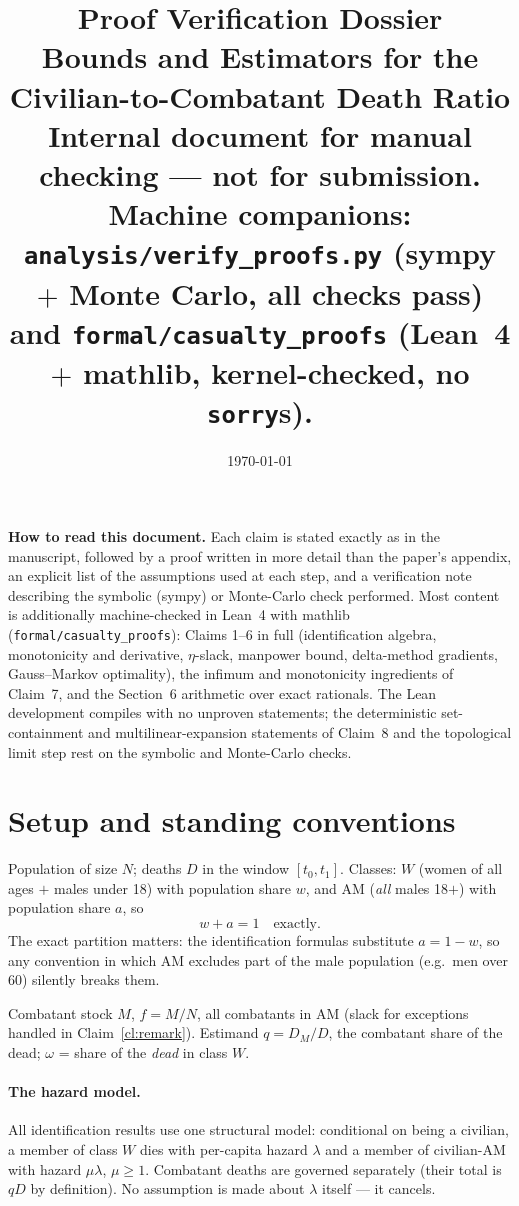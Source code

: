 \documentclass[11pt,a4paper]{article}
\title{\textbf{Proof Verification Dossier}\\[4pt]
\large Bounds and Estimators for the Civilian-to-Combatant Death Ratio\\[2pt]
\normalsize Internal document for manual checking --- not for submission.\\
Machine companions: \texttt{analysis/verify\_proofs.py} (sympy $+$ Monte Carlo, all checks pass)\\
and \texttt{formal/casualty\_proofs} (Lean~4 $+$ mathlib, kernel-checked, no \texttt{sorry}s).}
\author{}
\date{\today}
\theoremstyle{plain}
\theoremstyle{remark}
\begin{document}
\maketitle

\noindent\textbf{How to read this document.} Each claim is stated exactly as in the manuscript, followed by a proof written in more detail than the paper's appendix, an explicit list of the assumptions used at each step, and a verification note describing the symbolic (sympy) or Monte-Carlo check performed. Most content is additionally machine-checked in Lean~4 with mathlib (\texttt{formal/casualty\_proofs}): Claims 1--6 in full (identification algebra, monotonicity and derivative, $\eta$-slack, manpower bound, delta-method gradients, Gauss--Markov optimality), the infimum and monotonicity ingredients of Claim~7, and the Section~6 arithmetic over exact rationals. The Lean development compiles with no unproven statements; the deterministic set-containment and multilinear-expansion statements of Claim~8 and the topological limit step rest on the symbolic and Monte-Carlo checks.

\tableofcontents

\section{Setup and standing conventions}

Population of size $N$; deaths $D$ in the window $[t_0,t_1]$. Classes: $W$ (women of all ages $+$ males under 18) with population share $w$, and $\mathrm{AM}$ (\emph{all} males 18$+$) with population share $a$, so
\[
w + a = 1 \quad\text{exactly.}
\]
The exact partition matters: the identification formulas substitute $a=1-w$, so any convention in which $\mathrm{AM}$ excludes part of the male population (e.g.\ men over 60) silently breaks them.

Combatant stock $M$, $f = M/N$, all combatants in $\mathrm{AM}$ (slack for exceptions handled in Claim~\ref{cl:remark}). Estimand $q = D_M/D$, the combatant share of the dead; $\omega$ = share of the \emph{dead} in class $W$.

\paragraph{The hazard model.} All identification results use one structural model: conditional on being a civilian, a member of class $W$ dies with per-capita hazard $\lambda$ and a member of civilian-$\mathrm{AM}$ with hazard $\mu\lambda$, $\mu\ge 1$. Combatant deaths are governed separately (their total is $qD$ by definition). No assumption is made about $\lambda$ itself --- it cancels.
\end{document}
